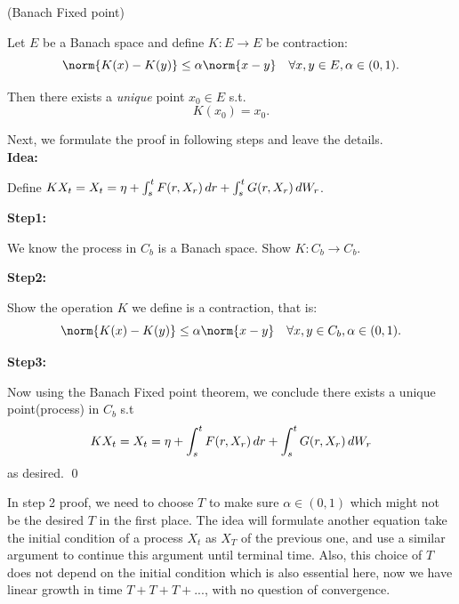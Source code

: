 \begin{thm}{(Banach Fixed point)}

Let $E$ be a Banach space and define $K: E\rightarrow E$ be contraction:
\begin{equation*}
    \norm{K(x)-K(y)} \leq \alpha \norm{x-y}\quad \forall x,y\in E, \alpha \in (0,1).
\end{equation*}

Then there exists a \textit{unique} point $x_0\in E$ s.t.
\begin{equation*}
    K(x_0) = x_0.
\end{equation*}
\end{thm}

Next, we formulate the proof in following steps and leave the details. \\
\textbf{Idea: }

Define $KX_t = X_t = \eta + \int_s^t F(r,X_r) \mathop{}\!d r+\int_s^t G(r,X_r) \mathop{}\!d W_r$.

\textbf{Step1: }

We know the process in $C_b$ is a Banach space.
Show $K: C_b \rightarrow C_b$.

\textbf{Step2: }

Show the operation $K$ we define is a contraction, that is:
\begin{equation*}
    \norm{K(x)-K(y)} \leq \alpha \norm{x-y}\quad \forall x,y\in C_b, \alpha \in (0,1).
\end{equation*}

\textbf{Step3: }

Now using the Banach Fixed point theorem, we conclude there exists a unique point(process) in $C_b$ s.t \begin{equation*}
    KX_t = X_t = \eta + \int_s^t F(r,X_r) \mathop{}\!d r+\int_s^t G(r,X_r) \mathop{}\!d W_r
\end{equation*} as desired.
\qed

\begin{rem}
In step 2 proof, we need to choose $T$ to make sure $\alpha \in (0,1)$ which might not be the desired $T$ in the first place. The idea will formulate another equation take the initial condition of a process $X_t$ as $X_T$ of the previous one, and use a similar argument to continue this argument until terminal time. Also, this choice of $T$ does not depend on the initial condition which is also essential here, now we have linear growth in time $T+ T+ T + ...$, with no question of convergence.
\end{rem}

